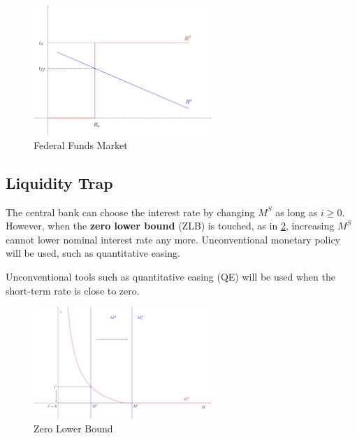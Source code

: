 \documentclass[12pt]{article}
\begin{document}
\begin{figure}[htp]
    \centering
    \includegraphics[width=0.6\textwidth]{ff_rate.png}
    \caption{Federal Funds Market}
    \label{fig:ff_rate}
\end{figure}

\newpage

\subsection*{Liquidity Trap}
The central bank can choose the interest rate by changing $M^S$ as long as $i\geq 0$. However, when the \textbf{zero lower bound} (ZLB) is touched, as in \ref{fig:zlb}, increasing $M^S$ cannot lower nominal interest rate any more. Unconventional monetary policy will be used, such as quantitative easing.

Unconventional tools such as quantitative easing (QE) will be used when the short-term rate is close to zero.

\begin{figure}[htp]
    \centering
    \includegraphics[width=0.6\textwidth]{zlb.png}
    \caption{Zero Lower Bound}
    \label{fig:zlb}
\end{figure}
\end{document}
